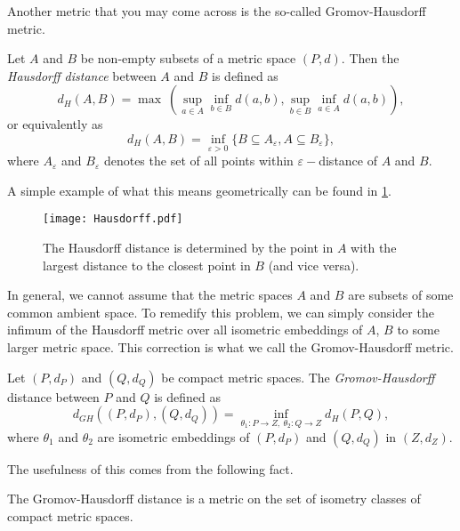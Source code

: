 Another metric that you may come across is the so-called Gromov-Hausdorff metric.
\begin{definition}
  Let $A$ and $B$ be non-empty subsets of a metric space $(P, d)$. Then the \textit{Hausdorff distance} between $A$ and $B$ is defined as
  \begin{equation*}
    d_{H}(A, B) = \max\:\left(\sup_{a \in A} \inf_{b \in B} d(a,b), \sup_{b \in B} \inf_{a \in A} d(a,b) \right),
  \end{equation*}
  or equivalently as
  \begin{equation*}
    d_{H}(A, B) = \inf_{\varepsilon > 0}\{B \subseteq A_{\varepsilon}, A \subseteq B_{\varepsilon}\},
  \end{equation*}
  where $A_{\varepsilon}$ and $B_{\varepsilon}$ denotes the set of all points within $\varepsilon-$distance of $A$ and $B$.
\end{definition}
A simple example of what this means geometrically can be found in \ref{fig:hausdorff}.

\begin{figure}[h!]
  \centering
  \texttt{[image: Hausdorff.pdf]}
  \caption{The Hausdorff distance is determined by the point in $A$ with the largest distance to the closest point in $B$ (and vice versa).}
  \label{fig:hausdorff}
\end{figure}

In general, we cannot assume that the metric spaces $A$ and $B$ are subsets of some common ambient space. To remedify this problem, we can simply consider the infimum of the Hausdorff metric over all isometric embeddings of $A$, $B$ to some larger metric space. This correction is what we call the Gromov-Hausdorff metric.

\begin{definition}
  Let $(P, d_{P})$ and $(Q, d_{Q})$ be compact metric spaces. The \textit{Gromov-Hausdorff} distance between $P$ and $Q$ is defined as
  \begin{equation*}
    d_{GH}((P, d_{P}), (Q, d_{Q})) = \inf_{\theta_{1}: P \to Z, \: \theta_{2}: Q \to Z}d_{H}(P, Q),
  \end{equation*}
  where $\theta_{1}$ and $\theta_{2}$ are isometric embeddings of $(P, d_{P})$ and $(Q, d_{Q})$ in $(Z, d_{Z})$.
\end{definition}

The usefulness of this comes from the following fact.
\begin{theorem}
  The Gromov-Hausdorff distance is a metric on the set of isometry classes of compact metric spaces.
\end{theorem}

